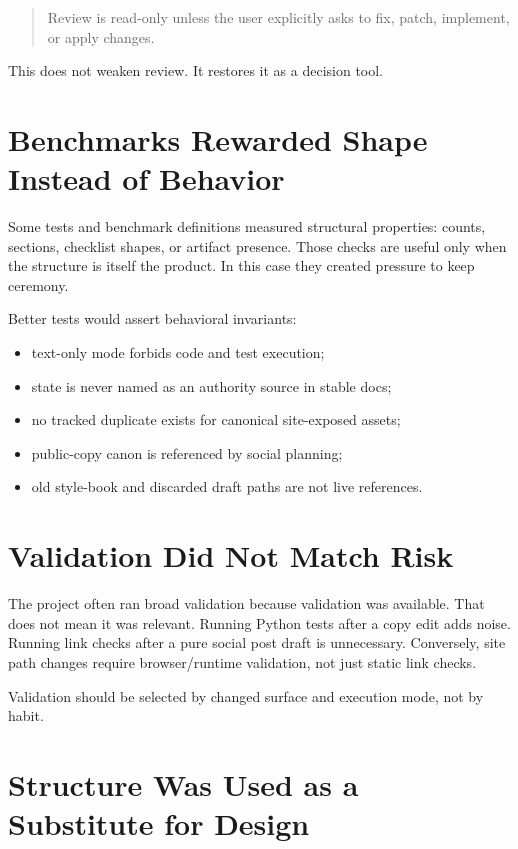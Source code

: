 \documentclass[a4paper,11pt,openany]{report}
\begin{document}
\begin{quote}
Review is read-only unless the user explicitly asks to fix, patch, implement, or
apply changes.
\end{quote}

This does not weaken review. It restores it as a decision tool.

\section{Benchmarks Rewarded Shape Instead of Behavior}

Some tests and benchmark definitions measured structural properties: counts,
sections, checklist shapes, or artifact presence. Those checks are useful only
when the structure is itself the product. In this case they created pressure to
keep ceremony.

Better tests would assert behavioral invariants:

\begin{itemize}
  \item text-only mode forbids code and test execution;
  \item state is never named as an authority source in stable docs;
  \item no tracked duplicate exists for canonical site-exposed assets;
  \item public-copy canon is referenced by social planning;
  \item old style-book and discarded draft paths are not live references.
\end{itemize}

\section{Validation Did Not Match Risk}

The project often ran broad validation because validation was available. That
does not mean it was relevant. Running Python tests after a copy edit adds noise.
Running link checks after a pure social post draft is unnecessary. Conversely,
site path changes require browser/runtime validation, not just static link
checks.

Validation should be selected by changed surface and execution mode, not by
habit.

\section{Structure Was Used as a Substitute for Design}
\end{document}
